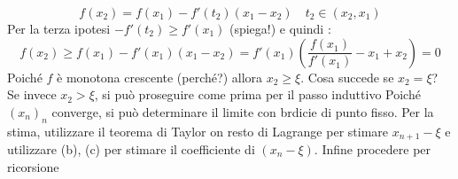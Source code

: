 \begin{enumerate}
{{			      \[
				      f\left(x_2\right) = f\left(x_1\right) - f'\left(t_2\right) \left(x_1-x_2\right)\quad t_2 \in  \left(x_2,x_1\right)
			      \]
			      Per la terza ipotesi $ -f' \left(t_2\right) \ge  f' \left(x_1\right) $ (spiega!) e quindi :
			      \[
				      f\left(x_2 \right)\ge  f\left(x_1\right) - f'\left(x_1\right)\left(x_1-x_2\right) = f'\left(x_1\right)\left(\frac{f\left(x_1\right)}{f'\left(x_1\right)} - x_1 + x_2\right) = 0
			      \]
			      Poiché $ f $ è monotona crescente (perché?) allora $ x_2 \ge  \xi  $. Cosa succede se $ x_2 = \xi  $? Se invece $ x_2 > \xi  $, si può proseguire come prima per il passo induttivo
			      \vskip3mm
			      Poiché $ \left(x_n\right)_n $ converge, si può determinare il limite con brdicie di punto fisso.
			      \vskip3mm
			      Per la stima, utilizzare il teorema di Taylor on resto di Lagrange per stimare $ x_{n+1} - \xi  $ e utilizzare (b), (c) per stimare il coefficiente di $ \left(x_n - \xi \right)$. Infine procedere per ricorsione
		      }
	      }
\end{enumerate}
